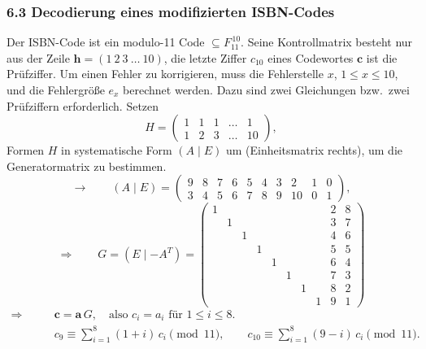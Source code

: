 \subsubsection*{6.3 Decodierung eines modifizierten ISBN-Codes}


Der ISBN-Code ist ein modulo-11 Code $\subseteq F_{11}^{\,10}$. Seine Kontrollmatrix besteht nur aus der Zeile
$\mathbf{h} = (1\ 2\ 3\ \dots\ 10)$, die letzte Ziffer $c_{10}$ eines Codewortes $\mathbf{c}$ ist die Prüfziffer.
Um einen Fehler zu korrigieren, muss die Fehlerstelle $x$, $1 \le x \le 10$, und die Fehlergröße $e_x$ berechnet werden.
Dazu sind zwei Gleichungen bzw.\ zwei Prüfziffern erforderlich. Setzen
\[
  H = \begin{pmatrix} 1 & 1 & 1 & \dots & 1\\ 1 & 2 & 3 & \dots & 10 \end{pmatrix},
\]
Formen $H$ in systematische Form $(A \mid E)$ um (Einheitsmatrix rechts), um die Generatormatrix zu bestimmen.
\[
  \to\qquad (A \mid E) = \begin{pmatrix}
    9 & 8 & 7 & 6 & 5 & 4 & 3 & 2 & 1 & 0\\
    3 & 4 & 5 & 6 & 7 & 8 & 9 & 10 & 0 & 1
  \end{pmatrix},
\]
\[
  \Rightarrow\qquad G = (E \mid -A^T) = \begin{pmatrix}
    1 & & & & & & & & 2 & 8\\
    & 1 & & & & & & & 3 & 7\\
    & & 1 & & & & & & 4 & 6\\
    & & & 1 & & & & & 5 & 5\\
    & & & & 1 & & & & 6 & 4\\
    & & & & & 1 & & & 7 & 3\\
    & & & & & & 1 & & 8 & 2\\
    & & & & & & & 1 & 9 & 1
  \end{pmatrix}
\]
\begin{align*}
  \Rightarrow\qquad & \mathbf{c} = \mathbf{a}\,G, \quad \text{also } c_i = a_i \text{ für } 1 \le i \le 8.\\
  & c_9 \equiv \sum_{i=1}^{8} (1+i)\,c_i \pmod{11}, \qquad c_{10} \equiv \sum_{i=1}^{8} (9-i)\,c_i \pmod{11}.
\end{align*}

